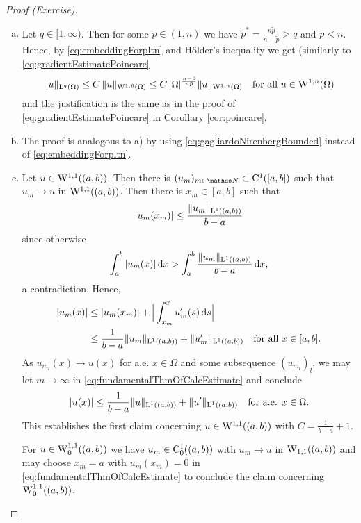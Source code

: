 \begin{proof}[Proof (Exercise)]
  \begin{enumerate}[a)]
    \item Let $q \in [1,\infty)$.
      Then for some $\tilde p \in (1,n)$ we have $\tilde p^* = \frac{n \tilde p}{n - \tilde p} > q$ and $\tilde p < n$.
      Hence, by \eqref{eq:embeddingForpltn} and Hölder's inequality we get (similarly to \eqref{eq:gradientEstimatePoincare}
      $$
      \|u\|_{\mathrm{L}^q(\Omega)} 
      \leq C\, \|u\|_{\mathrm{W}^{1,\tilde p}(\Omega)} 
      \leq C\, |\Omega|^{\frac{n - \tilde p}{n \tilde p}} \|u\|_{\mathrm{W}^{1,n}(\Omega)} \quad\text{for all } u \in \mathrm{W}^{1,n}(\Omega)
      $$
      and the justification is the same as in the proof of \eqref{eq:gradientEstimatePoincare} in Corollary \ref{cor:poincare}.

    \item The proof is analogous to a) by using \eqref{eq:gagliardoNirenbergBounded} instead of \eqref{eq:embeddingForpltn}.

    \item Let $u \in \mathrm{W}^{1,1}((a,b))$.
      Then there is $(u_m)_{m \in \N} \subset \CC^1([a,b])$ such that $u_m \to u$ in $\mathrm{W}^{1,1}((a,b))$.
      Then there is $x_m \in [a,b]$ such that
      $$
      |u_m(x_m)| \leq \frac{\|u_m\|_{\mathrm{L}^1((a,b))}}{b - a}
      $$
      since otherwise 
      $$\int_a^b|u_m(x)| \, {\operatorname{d}\!{x}} > \int_a^b \frac{\|u_m\|_{\mathrm{L}^1((a,b))}}{b - a} \, {\operatorname{d}\!{x}},$$
      a contradiction. 
      Hence,
      \begin{equation}
        \label{eq:fundamentalThmOfCalcEstimate}
        \begin{split}
        |u_m(x)| 
          &\leq |u_m(x_m)| + \Big| \int_{x_m}^x u_m'(s) \, {\operatorname{d}\!{s}} \Big| \\
          & \leq \frac{1}{b - a} \| u_m\|_{\mathrm{L}^1((a,b))} + \|u_m'\|_{\mathrm{L}^1((a,b))} \quad\text{for all } x \in [a,b].
        \end{split}
      \end{equation}
      As $u_{m_l}(x) \to u(x)$ for a.e. $x \in \Omega$ and some subsequence $(u_{m_l})_l$, we may let $m \to \infty$ in \eqref{eq:fundamentalThmOfCalcEstimate} and conclude
      $$
      |u(x)| \leq \frac{1}{b - a} \|u\|_{\mathrm{L}^1((a,b))} + \|u'\|_{\mathrm{L}^1((a,b))} \quad\text{for a.e. } x \in \Omega.
      $$
      This establishes the first claim concerning $u \in \mathrm{W}^{1,1}((a,b))$ with $C = \frac{1}{b - a} + 1$.

      For $u \in \mathrm{W}_0^{1,1}((a,b))$ we have $u_m \in \mathrm{C}_0^1((a,b))$ with $u_m \to u$ in $\mathrm{W}_{1,1}((a,b))$ and may choose $x_m = a$ with $u_m(x_m) = 0$ in \eqref{eq:fundamentalThmOfCalcEstimate} to conclude the claim concerning $\mathrm{W}_0^{1,1}((a,b))$. \qedhere
  \end{enumerate}
\end{proof}

